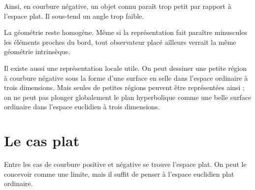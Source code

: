 Ainsi, en courbure négative, un objet connu paraît trop petit par rapport à l’espace plat. Il sous-tend un angle trop faible.

La géométrie reste homogène. Même si la représentation fait paraître minuscules les éléments proches du bord, tout observateur placé ailleurs verrait la même géométrie intrinsèque.

\begin{classroomqa}
\end{classroomqa}

\begin{classroomqa}
\end{classroomqa}

\begin{classroomqa}
\end{classroomqa}

Il existe aussi une représentation locale utile. On peut dessiner une petite région à courbure négative sous la forme d’une surface en selle dans l’espace ordinaire à trois dimensions. Mais seules de petites régions peuvent être représentées ainsi ; on ne peut pas plonger globalement le plan hyperbolique comme une belle surface ordinaire dans l’espace euclidien à trois dimensions.

\section{Le cas plat}

Entre les cas de courbure positive et négative se trouve l’espace plat. On peut le concevoir comme une limite, mais il suffit de penser à l’espace euclidien plat ordinaire.

